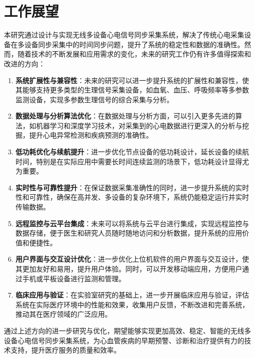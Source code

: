 \section{工作展望}

本研究通过设计与实现无线多设备心电信号同步采集系统，解决了传统心电采集设备在多设备同步采集中的时间同步问题，提升了系统的稳定性和数据的准确性。然而，随着技术的不断发展和应用需求的变化，未来的研究工作仍有许多值得探索和改进的方向：

\begin{enumerate}
    \item \textbf{系统扩展性与兼容性}：未来的研究可以进一步提升系统的扩展性和兼容性，使其能够支持更多类型的生理信号采集设备，如血氧、血压、呼吸频率等多参数监测设备，实现多参数生理信号的综合采集与分析。

    \item \textbf{数据处理与分析算法优化}：在数据处理与分析方面，可以引入更多先进的算法，如机器学习和深度学习技术，对采集到的心电数据进行更深入的分析与挖掘，提升心电异常检测和疾病预测的准确性。

    \item \textbf{低功耗优化与续航提升}：进一步优化节点设备的低功耗设计，延长设备的续航时间，特别是在实际应用中需要长时间连续监测的场景下，低功耗设计显得尤为重要。

    \item \textbf{实时性与可靠性提升}：在保证数据采集准确性的同时，进一步提升系统的实时性和可靠性，确保在高并发、多设备的复杂环境下，系统仍能稳定运行并实时传输数据。

    \item \textbf{远程监控与云平台集成}：未来可以将系统与云平台进行集成，实现远程监控与数据存储，便于医生和研究人员随时随地访问和分析数据，提升系统的应用价值和便捷性。

    \item \textbf{用户界面与交互设计优化}：进一步优化上位机软件的用户界面与交互设计，使其更加友好和易用，提升用户体验。同时，可以开发移动端应用，方便用户通过手机或平板设备进行监测和管理。

    \item \textbf{临床应用与验证}：在实验室研究的基础上，进一步开展临床应用与验证，评估系统在实际医疗环境中的性能和效果，收集用户反馈，不断改进和完善系统，推动其在医疗领域的广泛应用。
\end{enumerate}

通过上述方向的进一步研究与优化，期望能够实现更加高效、稳定、智能的无线多设备心电信号同步采集系统，为心血管疾病的早期预警、诊断和治疗提供有力的技术支持，提升医疗服务的质量和效率。

\newpage
